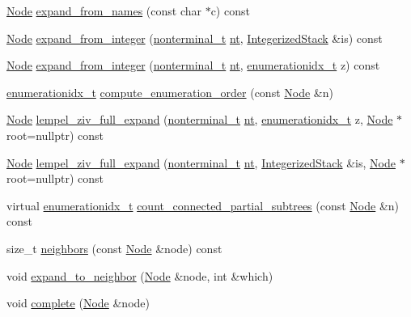 \begin{DoxyCompactItemize}
\item 
\hyperlink{class_node}{Node} \hyperlink{class_grammar_af4f8e4c2b0ad93970e579ea56c2fde60}{expand\+\_\+from\+\_\+names} (const char $\ast$c) const
\item 
\hyperlink{class_node}{Node} \hyperlink{class_grammar_ab20256e7e9e4c6077043465b3d440be9}{expand\+\_\+from\+\_\+integer} (\hyperlink{_nonterminal_8h_a5c1f658dc7560600a16d22408bd716ca}{nonterminal\+\_\+t} \hyperlink{class_grammar_a047b55bfbd87c52e9d969af62c2932ab}{nt}, \hyperlink{class_integerized_stack}{Integerized\+Stack} \&is) const
\item 
\hyperlink{class_node}{Node} \hyperlink{class_grammar_a795d45fbbafb5c5dc17e5898a2016ce2}{expand\+\_\+from\+\_\+integer} (\hyperlink{_nonterminal_8h_a5c1f658dc7560600a16d22408bd716ca}{nonterminal\+\_\+t} \hyperlink{class_grammar_a047b55bfbd87c52e9d969af62c2932ab}{nt}, \hyperlink{_numerics_8h_a9fe2bbca873b046b2bd276fc6856bb88}{enumerationidx\+\_\+t} z) const
\item 
\hyperlink{_numerics_8h_a9fe2bbca873b046b2bd276fc6856bb88}{enumerationidx\+\_\+t} \hyperlink{class_grammar_a37b475b665c37057084d9244abcf25f9}{compute\+\_\+enumeration\+\_\+order} (const \hyperlink{class_node}{Node} \&n)
\item 
\hyperlink{class_node}{Node} \hyperlink{class_grammar_adea898b27f2cf76417e4b686c1045e54}{lempel\+\_\+ziv\+\_\+full\+\_\+expand} (\hyperlink{_nonterminal_8h_a5c1f658dc7560600a16d22408bd716ca}{nonterminal\+\_\+t} \hyperlink{class_grammar_a047b55bfbd87c52e9d969af62c2932ab}{nt}, \hyperlink{_numerics_8h_a9fe2bbca873b046b2bd276fc6856bb88}{enumerationidx\+\_\+t} z, \hyperlink{class_node}{Node} $\ast$root=nullptr) const
\item 
\hyperlink{class_node}{Node} \hyperlink{class_grammar_a37ccd1307ac9cb13a9653ba6c2134498}{lempel\+\_\+ziv\+\_\+full\+\_\+expand} (\hyperlink{_nonterminal_8h_a5c1f658dc7560600a16d22408bd716ca}{nonterminal\+\_\+t} \hyperlink{class_grammar_a047b55bfbd87c52e9d969af62c2932ab}{nt}, \hyperlink{class_integerized_stack}{Integerized\+Stack} \&is, \hyperlink{class_node}{Node} $\ast$root=nullptr) const
\item 
virtual \hyperlink{_numerics_8h_a9fe2bbca873b046b2bd276fc6856bb88}{enumerationidx\+\_\+t} \hyperlink{class_grammar_ad1e2c22753f18d1dcdd9d81576045e9f}{count\+\_\+connected\+\_\+partial\+\_\+subtrees} (const \hyperlink{class_node}{Node} \&n) const
\item 
size\+\_\+t \hyperlink{class_grammar_a486cec3b8e6c757eb348031ff8118a99}{neighbors} (const \hyperlink{class_node}{Node} \&node) const
\item 
void \hyperlink{class_grammar_a0765273e6b0957410447ad5d74e424bf}{expand\+\_\+to\+\_\+neighbor} (\hyperlink{class_node}{Node} \&node, int \&which)
\item 
void \hyperlink{class_grammar_a51a44e86d41c6e8a8ff7665208ac55da}{complete} (\hyperlink{class_node}{Node} \&node)
\end{DoxyCompactItemize}
